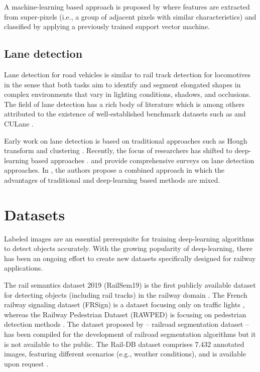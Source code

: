 \documentclass[Master,MDS,english]{BASE/twbook} %
\begin{document}
A machine-learning based approach is proposed by \cite{teng2016visual} where features are extracted from super-pixels (i.e., a group of adjacent pixels with similar characteristics) and classified by applying a previously trained support vector machine.


\section{Lane detection} \label{sec:lane_detection}

Lane detection for road vehicles is similar to rail track detection for locomotives in the sense that both tasks aim to identify and segment elongated shapes in complex environments that vary in lighting conditions, shadows, and occlusions. 
The field of lane detection has a rich body of literature which is among others attributed to the existence of well-established benchmark datasets such as \cite{TuSimple} and CULane \citep{pan2018SCNN}. 

Early work on lane detection is based on traditional approaches such as Hough transform and clustering \citep{10.1145/361237.361242, 5432669}. Recently, the focus of researchers has shifted to deep-learning based approaches \citep{meyer2021yolino, zheng2022clrnet, wang2022keypoint}.
\cite{tang2021review} and \cite{yang2023lane} provide comprehensive surveys on lane detection approaches. In \cite{yang2023lane}, the authors propose a combined approach in which the advantages of traditional and deep-learning based methods are mixed.


\chapter{Datasets} %

Labeled images are an essential prerequisite for training deep-learning algorithms to detect objects accurately.
With the growing popularity of deep-learning, there has been an ongoing effort to create new datasets specifically designed for railway applications.

The rail semantics dataset 2019 (RailSem19) is the first publicly available
dataset for detecting objects (including rail tracks) in the railway domain \citep{9025646}. 
The French railway signaling dataset (FRSign) is a dataset focusing only on traffic lights \citep{harb2020frsign}, whereas the Railway Pedestrian Dataset (RAWPED) is focusing on pedestrian detection methods \citep{9050835}. The dataset proposed by \cite{8859360} -- railroad segmentation dataset -- has been compiled for the development of railroad segmentation algorithms but it is not available to the public. The Rail-DB dataset comprises 7.432 annotated images, featuring different scenarios (e.g., weather conditions), and is available upon request \citep{10.1145/3503161.3548050}.  
\end{document}
